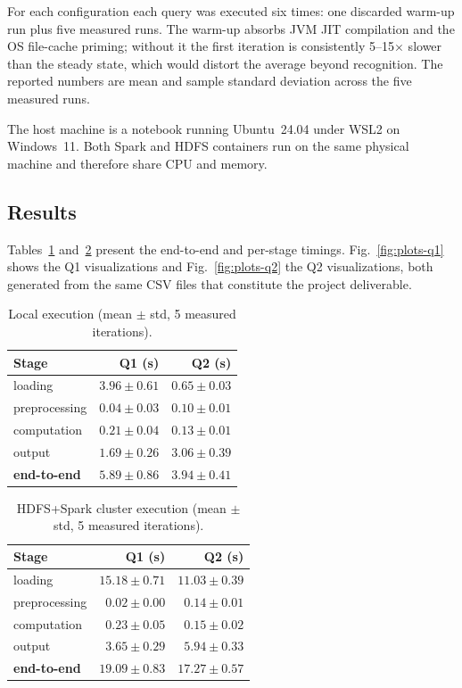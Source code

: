 \documentclass[conference]{IEEEtran}
\begin{document}
For each configuration each query was executed six times: one
discarded warm-up run plus five measured runs. The warm-up
absorbs JVM JIT compilation and the OS file-cache priming;
without it the first iteration is consistently 5--15$\times$
slower than the steady state, which would distort the average
beyond recognition. The reported numbers are mean and sample
standard deviation across the five measured runs.

The host machine is a notebook running Ubuntu~24.04 under WSL2
on Windows~11. Both Spark and HDFS containers run on the same
physical machine and therefore share CPU and memory.

\subsection{Results}

Tables~\ref{tab:bench-local} and~\ref{tab:bench-hdfs} present
the end-to-end and per-stage timings. Fig.~\ref{fig:plots-q1}
shows the Q1 visualizations and Fig.~\ref{fig:plots-q2} the Q2
visualizations, both generated from the same CSV files that
constitute the project deliverable.

\begin{table}[h]
\centering
\caption{Local execution (mean $\pm$ std, 5 measured iterations).}
\label{tab:bench-local}
\setlength{\tabcolsep}{4pt}
\begin{tabular}{lrr}
\toprule
\textbf{Stage} & \textbf{Q1 (s)} & \textbf{Q2 (s)}\\
\midrule
loading        & $3.96 \pm 0.61$ & $0.65 \pm 0.03$\\
preprocessing  & $0.04 \pm 0.03$ & $0.10 \pm 0.01$\\
computation    & $0.21 \pm 0.04$ & $0.13 \pm 0.01$\\
output         & $1.69 \pm 0.26$ & $3.06 \pm 0.39$\\
\midrule
\textbf{end-to-end} & $\mathbf{5.89 \pm 0.86}$ & $\mathbf{3.94 \pm 0.41}$\\
\bottomrule
\end{tabular}
\end{table}

\begin{table}[h]
\centering
\caption{HDFS+Spark cluster execution (mean $\pm$ std, 5 measured iterations).}
\label{tab:bench-hdfs}
\setlength{\tabcolsep}{4pt}
\begin{tabular}{lrr}
\toprule
\textbf{Stage} & \textbf{Q1 (s)} & \textbf{Q2 (s)}\\
\midrule
loading        & $15.18 \pm 0.71$ & $11.03 \pm 0.39$\\
preprocessing  & $0.02 \pm 0.00$  & $0.14 \pm 0.01$\\
computation    & $0.23 \pm 0.05$  & $0.15 \pm 0.02$\\
output         & $3.65 \pm 0.29$  & $5.94 \pm 0.33$\\
\midrule
\textbf{end-to-end} & $\mathbf{19.09 \pm 0.83}$ & $\mathbf{17.27 \pm 0.57}$\\
\bottomrule
\end{tabular}
\end{table}
\end{document}
